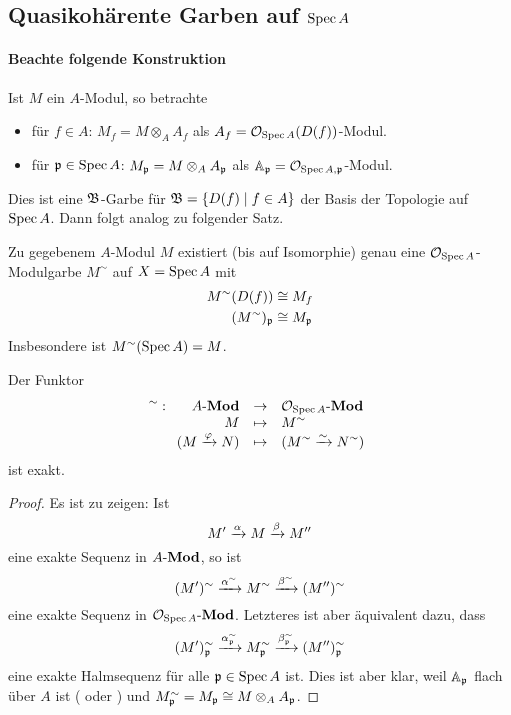 \subsection{Quasikohärente Garben auf $\operatorname{Spec} A$}

\paragraph{Beachte folgende Konstruktion}
Ist $M$ ein $A$-Modul, so betrachte
\begin{itemize}
  \item für $f \in A$: $M_f = M \otimes_A A_f$ 
    als $A_f = \mathcal{O}_{\operatorname{Spec} A}(D(f))$-Modul.
  \item für $\mathfrak{p} \in \operatorname{Spec} A$: $M_\mathfrak{p} = M\otimes_A A_\mathfrak{p}$
    als $\mathbb{A}_\mathfrak{p} = \mathcal{O}_{\operatorname{Spec} A,\mathfrak{p}}$-Modul.
\end{itemize}
Dies ist eine $\mathfrak B$-Garbe für $\mathfrak B = \{D(f)\mid f\in A\}$ der Basis 
der Topologie auf $\operatorname{Spec} A$. Dann folgt analog zu 
 folgender Satz.

\begin{satz}
    \label{satz:a modul hat ein o spec a modulgarbe}
    Zu gegebenem $A$-Modul $M$ existiert (bis auf Isomorphie) genau eine
    $\mathcal{O}_{\operatorname{Spec} A}$-Modulgarbe $M^\sim$ auf $X = \operatorname{Spec} A$ mit
    \begin{align*}
        M^\sim (D(f)) &\cong M_f\\
        (M^\sim)_\mathfrak{p} &\cong M_\mathfrak{p}
    \end{align*} 
    Insbesondere ist $M^\sim(\operatorname{Spec} A) = M$.
\end{satz}



\begin{satz}
    Der Funktor
    \[
        ^\sim: \funcdef{ \Moduln{A} & \to & \Moduln{\O_{\Spec A}} \\
            M & \mapsto & M^\sim\\
            (M \xto{\varphi} N) & \mapsto &  (M^\sim \xto{\sim} N^\sim)}
    \]
    ist exakt.
\end{satz}
\begin{proof}
    Es ist zu zeigen: Ist
    \[ M' \xrightarrow\alpha M \xrightarrow\beta M''\]
    eine exakte Sequenz in $A\text{-}\mathbf{Mod}$, so ist
    \[ (M')^\sim \xrightarrow{\alpha^\sim} M^\sim \xrightarrow{\beta^\sim} (M'')^\sim\]
    eine exakte Sequenz in $\mathcal{O}_{\operatorname{Spec} A}\text{-}\mathbf{Mod}$. Letzteres ist aber
    äquivalent dazu, dass
    \[ (M')_\mathfrak{p}^\sim \xrightarrow{\alpha_\mathfrak{p}^\sim} M_\mathfrak{p}^\sim \xrightarrow{\beta_\mathfrak{p}^\sim}
         (M'')_\mathfrak{p}^\sim\]
    eine exakte Halmsequenz für alle $\mathfrak{p}\in\operatorname{Spec} A$ ist.
    Dies ist aber klar, weil $\mathbb{A}_\mathfrak{p}$ flach über $A$ ist 
    (\autocite[Example 9.1.1]{hartshorne1977algebraic} oder
    \autocite[Abschnitt 7 Satz 8]{bosch2009algebra}) und
    $M_\mathfrak{p}^\sim = M_\mathfrak{p} \cong M\otimes_A A_\mathfrak{p}$. 
\end{proof}

